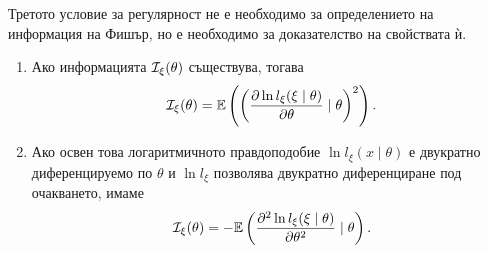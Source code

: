 \documentclass[numbers=endperiod, DIV=15, bibliography=totocnumbered]{scrartcl}
\begin{document}
\begin{note}
  Третото условие за регулярност не е необходимо за определението на информация на Фишър, но е необходимо за доказателство на свойствата ѝ.
\end{note}

\begin{theorem}
  \mbox{}
  \begin{enumerate}
    \item Ако информацията $\mathcal{I}_\xi(\theta)$ съществува, тогава
    \begin{displaymath}
      \mathcal{I}_\xi(\theta) = \mathbb{E}\left( {\left( \frac {\partial \ln l_\xi(\xi \mid \theta)} {\partial \theta} \mid \theta \right)}^2 \right).
    \end{displaymath}

    \item Ако освен това логаритмичното правдоподобие $\ln l_\xi (x \mid \theta)$ е двукратно диференцируемо по $\theta$ и $\ln l_\xi$ позволява двукратно диференциране под очакването, имаме
    \begin{displaymath}
      \mathcal{I}_\xi(\theta) = -\mathbb{E}\left( \frac {\partial^2 \ln l_\xi(\xi \mid \theta)} {\partial \theta^2} \mid \theta \right).
    \end{displaymath}
  \end{enumerate}
\end{theorem}
\end{document}
